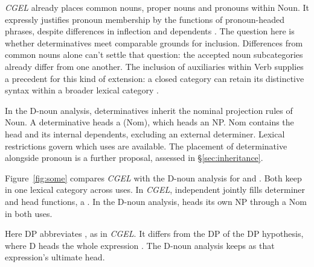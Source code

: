 \documentclass[12pt]{article}
\begin{document}
\textit{CGEL} already places common nouns, proper nouns and pronouns within Noun. It expressly justifies pronoun membership by the functions of pronoun-headed phrases, despite differences in inflection and dependents \citep[327--328]{huddleston2002}. The question here is whether determinatives meet comparable grounds for inclusion. Differences from common nouns alone can't settle that question: the accepted noun subcategories already differ from one another. The inclusion of auxiliaries within Verb supplies a precedent for this kind of extension: a closed category can retain its distinctive syntax within a broader lexical category \citep{pullumwilson1977}.

In the D-noun analysis, determinatives inherit the nominal projection rules of Noun. A determinative heads a  (Nom), which heads an NP. Nom contains the head and its internal dependents, excluding an external determiner. Lexical restrictions govern which uses are available. The placement of determinative alongside pronoun is a further proposal, assessed in §\ref{sec:inheritance}.

Figure~\ref{fig:some} compares \textit{CGEL} with the D-noun analysis for  and . Both keep  in one lexical category across uses. In \textit{CGEL}, independent  jointly fills determiner and head functions, a  \citep[410--412]{huddleston2002}. In the D-noun analysis,  heads its own NP through a Nom in both uses.

Here DP abbreviates , as in \textit{CGEL}. It differs from the DP of the DP hypothesis, where D heads the whole expression  \citep{abney1987}. The D-noun analysis keeps  as that expression's ultimate head.
\end{document}
